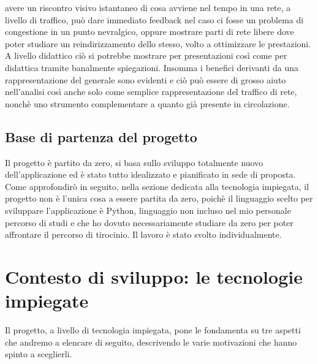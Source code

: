 \documentclass[binding=0.6cm]{sapthesis}
\begin{document}
avere un riscontro visivo istantaneo di cosa avviene nel tempo in una rete, a livello di traffico, può dare immediato feedback nel
caso ci fosse un problema di congestione in un punto nevralgico, oppure mostrare parti di rete libere dove poter studiare un
reindirizzamento dello stesso, volto a ottimizzare le prestazioni. A livello didattico ciò si potrebbe mostrare per presentazioni così come per didattica tramite banalmente spiegazioni. 
Insomma i benefici derivanti da una rappresentazione del generale sono evidenti e ciò
può essere di grosso aiuto nell'analisi così anche solo come semplice rappresentazione del traffico di rete, nonchè uno strumento complementare a quanto già presente in circolazione.

\section{Base di partenza del progetto}
Il progetto è partito da zero, si basa sullo sviluppo totalmente nuovo dell'applicazione ed è stato tutto idealizzato e pianificato in sede di proposta.
Come approfondirò in seguito, nella sezione dedicata alla tecnologia impiegata, il progetto non è l'unica cosa a essere partita da zero, poichè il linguaggio
scelto per sviluppare l'applicazione è Python\cite{PythonWebsite}, linguaggio non incluso nel mio 
personale percorso di studi e che ho dovuto necessariamente studiare da zero per poter affrontare il percorso di tirocinio.
Il lavoro è stato svolto individualmente.

\chapter{Contesto di sviluppo: le tecnologie impiegate}
Il progetto, a livello di tecnologia impiegata, pone le fondamenta su tre aspetti che andremo a 
elencare di seguito, descrivendo le varie motivazioni che hanno spinto a sceglierli. 
\end{document}
